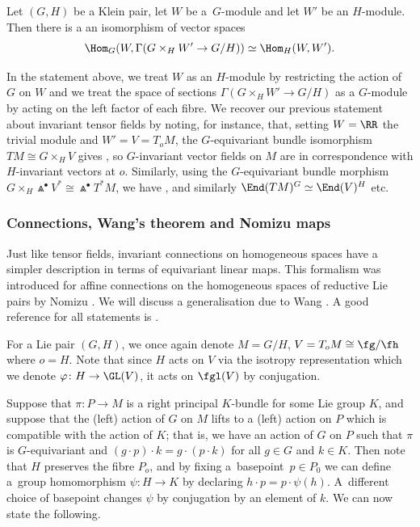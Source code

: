 \begin{Proposition}\label{thm:Frobenius-recipr}
	Let $(G,H)$ be a Klein pair, let $W$ be a~$G$-module and let $W'$ be an $H$-module. Then there is a an isomorphism of vector spaces
	\[
		\Hom_G(W,\Gamma(G\times_H W'\to G/H)) \simeq \Hom_H(W,W').
	\]
\end{Proposition}

In the statement above, we treat $W$ as an $H$-module by restricting the action of $G$ on $W$ and we treat the space of sections $\Gamma(G\times_H W'\to G/H)$ as a $G$-module by acting on the left factor of each fibre. We recover our previous statement about invariant tensor fields by noting, for instance, that, setting $W=\RR$ the trivial module and $W'=V=T_oM$, the $G$-equivariant bundle isomorphism $TM \cong G\times_H V$ gives
,
so $G$-invariant vector fields on $M$ are in correspondence with $H$-invariant vectors at $o$. Similarly, using the $G$-equivariant bundle morphism $G\times_H \Wedge^\bullet V^* \cong \Wedge^\bullet T^*M$,
we have
,
and similarly $\End(TM)^G\simeq \End(V)^H$ etc.

\subsubsection{Connections, Wang's theorem and Nomizu maps}
\label{sec:nomizu}

Just like tensor fields, invariant connections on homogeneous spaces have a simpler description in terms of equivariant linear maps. This formalism was introduced for affine connections on the homogeneous spaces of reductive Lie pairs by Nomizu \cite{Nomizu1954}. We will discuss a generalisation due to Wang \cite{Wang1958}. A good reference for all statements is \cite{Nomizu1969}.

For a Lie pair $(G,H)$, we once again denote $M=G/H$, $V=T_oM\cong\fg/\fh$ where $o=H$. Note that since $H$ acts on $V$ via the isotropy representation which we denote $\varphi\colon H\to\GL(V)$, it acts on $\fgl(V)$ by conjugation.


Suppose that $\pi\colon P\to M$ is a right principal $K$-bundle for some Lie group $K$, and suppose that the (left) action of $G$ on $M$ lifts to a (left) action on $P$ which is compatible with the action of $K$; that is, we have an action of $G$ on $P$ such that $\pi$ is $G$-equivariant and $(g\cdot p)\cdot k=g\cdot (p\cdot k)$ for all $g\in G$ and $k\in K$. Then note that $H$ preserves the fibre $P_o$, and by fixing a~basepoint~${p\in P_0}$ we can define a~group homomorphism $\psi\colon H\to K$ by declaring $h\cdot p = p\cdot\psi(h)$. A~different choice of basepoint changes $\psi$ by conjugation by an element of $k$. We can now state the following.

